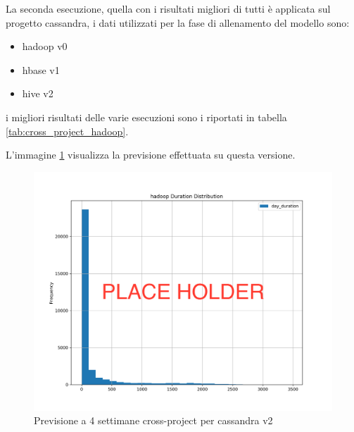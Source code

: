 \documentclass[%
    corpo=12pt,
    twoside,
    oldstyle,
    autoretitolo,
    greek,
    evenboxes,
]{toptesi}
\begin{document}
La seconda esecuzione, quella con i risultati migliori di tutti è applicata sul progetto cassandra, i dati utilizzati per la fase di allenamento del modello sono:
\begin{itemize}
  \item hadoop v0
  \item hbase v1
  \item hive v2
\end{itemize}
i migliori risultati delle varie esecuzioni sono i riportati in tabella \ref{tab:cross_project_hadoop}.
\begin{center}
   \label{tab:cross_project_hadoop}
\end{center}
L'immagine \ref{fig:cassandra_cp_nn_4w} visualizza la previsione effettuata su questa versione.
\begin{figure}[!ht]
  \includegraphics[width=\linewidth]{figure/place_holder.png}
  \caption{Previsione a 4 settimane cross-project per cassandra v2}
  \label{fig:cassandra_cp_nn_4w}
\end{figure}
\end{document}
